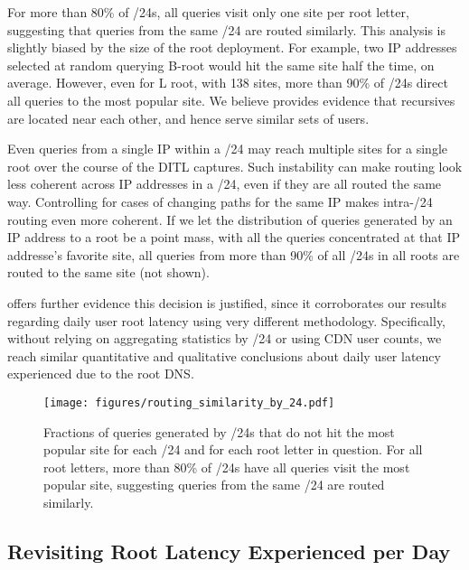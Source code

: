 \documentclass[sigconf,letterpaper,nonacm,10pt,anonymous]{acmart}
\begin{document}
For more than 80\% of /24s, all queries visit only one site per root
letter, suggesting that queries from the same /24 are routed similarly.
This analysis is slightly biased by the size of the root deployment. For
example, two IP addresses selected at random querying B-root would hit
the same site half the time, on average. However, even for L root, with
138 sites, more than 90\% of /24s direct all queries to the most popular
site. We believe  provides evidence
that recursives are located near each other, and hence serve similar
sets of users.

Even queries from a single IP within a /24 may reach multiple sites for
a single root over the course of the DITL captures. Such instability can
make routing look less coherent across IP addresses in a /24, even if
they are all routed the same way. Controlling for cases of changing
paths for the same IP makes intra-/24 routing even more coherent. If we
let the distribution of queries generated by an IP address to a root be
a point mass, with all the queries concentrated at that IP addresse's
favorite site, all queries from more than 90\% of all /24s in all roots
are routed to the same site (not shown).

 offers further evidence this
decision is justified, since it corroborates our results regarding daily
user root latency using very different methodology. Specifically,
without relying on aggregating statistics by /24 or using CDN user
counts, we reach similar quantitative and qualitative conclusions about
daily user latency experienced due to the root DNS.

\begin{figure}
    \centering
    \texttt{[image: figures/routing\_similarity\_by\_24.pdf]}
    \caption{Fractions of queries generated by /24s that do not hit the most popular site for each /24 and for each root letter in question. For all root letters, more than 80\% of /24s have all queries visit the most popular site, suggesting queries from the same /24 are routed similarly.}
    \label{fig:routing_similarity_by_24}
\end{figure}

\subsection{Revisiting Root Latency Experienced per
Day}\label{revisiting-root-latency-experienced-per-day-1}

\label{ap:apnic_root_latency_per_day}
\end{document}
